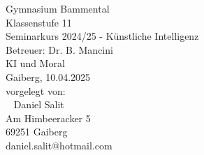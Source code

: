 \documentclass[12pt]{extarticle}
\begin{document}
    \begin{titlepage}
        \begin{center}
            \vspace{3 cm}
            \large
            Gymnasium Bammental \\
            Klassenstufe 11 \\
            Seminarkurs 2024/25 - Künstliche Intelligenz \\
            Betreuer: Dr. B. Mancini \\
            \vfill
            \HUGE KI und Moral \\
            \vspace{5 cm}
            \large
            Gaiberg, 10.04.2025 \\
            \vspace{2 cm}
            vorgelegt von: \\
            ~\newline
            Daniel Salit \\
            Am Himbeeracker 5 \\
            69251 Gaiberg \\
            daniel.salit@hotmail.com \\
        \end{center}
    \end{titlepage}


    \tableofcontents

    \clearpage
\end{document}

